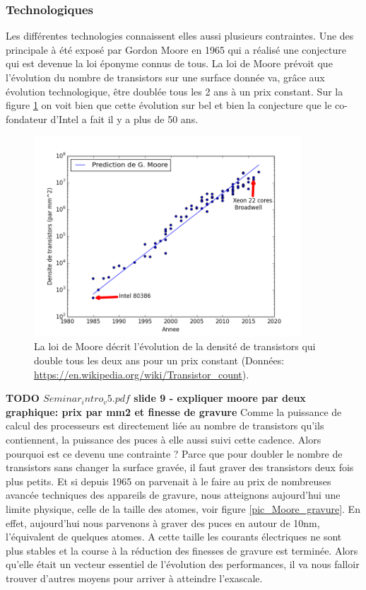 \subsubsection{Technologiques}
Les différentes technologies connaissent elles aussi plusieurs contraintes. Une des principale à été exposé par Gordon Moore en 1965 qui a réalisé une conjecture qui est devenue la loi éponyme connus de tous. La loi de Moore prévoit que l'évolution du nombre de transistors sur une surface donnée va, grâce aux évolution technologique, être doublée tous les 2 ans à un prix constant. Sur la figure \ref{pic_Moore_prediction} on voit bien que cette évolution sur bel et bien la conjecture que le co-fondateur d'Intel a fait il y a plus de 50 ans.

\begin{figure}
    \center
    \includegraphics[width=10cm]{images/Chapitre1/Moore_prediction.png}
    \caption{\label{pic_Moore_prediction} La loi de Moore décrit l'évolution de la densité de transistors qui double tous les deux ans pour un prix constant (Données:  \url{https://en.wikipedia.org/wiki/Transistor_count}).}
\end{figure}


\textbf{TODO $Seminar_intro_v5.pdf$ slide 9 - expliquer moore par deux graphique: prix par mm2 et finesse de gravure}
Comme la puissance de calcul des processeurs est directement liée au nombre de transistors qu'ils contiennent, la puissance des puces à elle aussi suivi cette cadence. Alors pourquoi est ce devenu une contrainte ? Parce que pour doubler le nombre de transistors sans changer la surface gravée, il faut graver des transistors deux fois plus petits. Et si depuis 1965 on parvenait à le faire  au prix de nombreuses avancée techniques des appareils de gravure, nous atteignons aujourd'hui une limite physique, celle de la taille des atomes, voir figure \ref{pic_Moore_gravure}. En effet, aujourd'hui nous parvenons à graver des puces en autour de 10nm,  l'équivalent de quelques atomes. A cette taille les courants électriques ne sont plus stables et la course à la réduction des finesses de gravure est terminée. Alors qu'elle était un vecteur essentiel de l'évolution des performances, il va nous falloir trouver d'autres moyens pour arriver à atteindre l'exascale.

